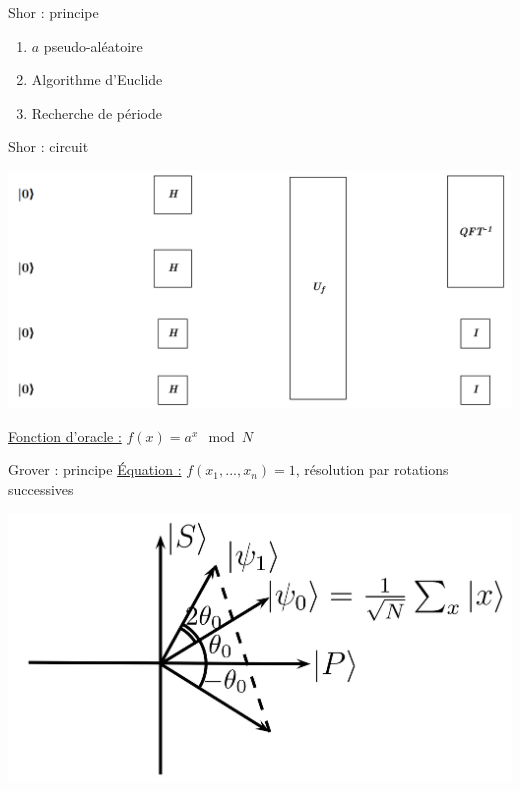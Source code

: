 \documentclass[french]{beamer}
\begin{document}
\begin{frame}{Shor : principe}
    \begin{enumerate}
        \item $a$ pseudo-aléatoire
        \item Algorithme d'Euclide
        \item Recherche de période
    \end{enumerate}
\end{frame}

\begin{frame}{Shor : circuit}
    \begin{center}
        \includegraphics[scale=0.17]{ShorInterface.png}
    \end{center}
    \underline{Fonction d'oracle :} $f(x) = a^x \mod N$
\end{frame}

\begin{frame}{Grover : principe}
    \underline{Équation :} $f(x_1, ..., x_n) = 1$, résolution par rotations successives
    \begin{center}
        \includegraphics[scale=0.1]{Rotations.png}
    \end{center}
\end{frame}
\end{document}
